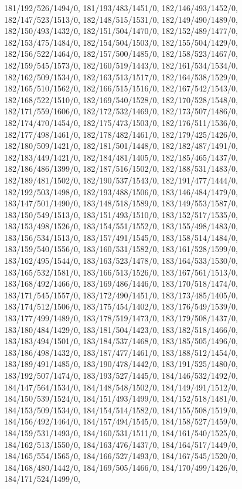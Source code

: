 {181/192/526/1494/0,%
181/193/483/1451/0,%
182/146/493/1452/0,%
182/147/523/1513/0,%
182/148/515/1531/0,%
182/149/490/1489/0,%
182/150/493/1432/0,%
182/151/504/1470/0,%
182/152/489/1477/0,%
182/153/475/1484/0,%
182/154/504/1503/0,%
182/155/504/1429/0,%
182/156/522/1464/0,%
182/157/500/1485/0,%
182/158/523/1467/0,%
182/159/545/1573/0,%
182/160/519/1443/0,%
182/161/534/1534/0,%
182/162/509/1534/0,%
182/163/513/1517/0,%
182/164/538/1529/0,%
182/165/510/1562/0,%
182/166/515/1516/0,%
182/167/542/1543/0,%
182/168/522/1510/0,%
182/169/540/1528/0,%
182/170/528/1548/0,%
182/171/559/1606/0,%
182/172/532/1469/0,%
182/173/507/1486/0,%
182/174/470/1454/0,%
182/175/473/1503/0,%
182/176/511/1536/0,%
182/177/498/1461/0,%
182/178/482/1461/0,%
182/179/425/1426/0,%
182/180/509/1421/0,%
182/181/501/1448/0,%
182/182/487/1491/0,%
182/183/449/1421/0,%
182/184/481/1405/0,%
182/185/465/1437/0,%
182/186/486/1399/0,%
182/187/516/1502/0,%
182/188/531/1483/0,%
182/189/481/1502/0,%
182/190/537/1543/0,%
182/191/477/1444/0,%
182/192/503/1498/0,%
182/193/488/1506/0,%
183/146/484/1479/0,%
183/147/501/1490/0,%
183/148/518/1589/0,%
183/149/553/1587/0,%
183/150/549/1513/0,%
183/151/493/1510/0,%
183/152/517/1535/0,%
183/153/498/1526/0,%
183/154/551/1552/0,%
183/155/498/1483/0,%
183/156/534/1513/0,%
183/157/491/1545/0,%
183/158/514/1484/0,%
183/159/540/1556/0,%
183/160/531/1582/0,%
183/161/528/1599/0,%
183/162/495/1544/0,%
183/163/523/1478/0,%
183/164/533/1530/0,%
183/165/532/1581/0,%
183/166/513/1526/0,%
183/167/561/1513/0,%
183/168/492/1466/0,%
183/169/486/1446/0,%
183/170/518/1474/0,%
183/171/545/1557/0,%
183/172/490/1451/0,%
183/173/485/1405/0,%
183/174/512/1506/0,%
183/175/454/1402/0,%
183/176/549/1539/0,%
183/177/499/1489/0,%
183/178/519/1473/0,%
183/179/508/1437/0,%
183/180/484/1429/0,%
183/181/504/1423/0,%
183/182/518/1466/0,%
183/183/494/1501/0,%
183/184/537/1468/0,%
183/185/505/1496/0,%
183/186/498/1432/0,%
183/187/477/1461/0,%
183/188/512/1454/0,%
183/189/491/1485/0,%
183/190/478/1442/0,%
183/191/525/1480/0,%
183/192/507/1474/0,%
183/193/527/1445/0,%
184/146/532/1492/0,%
184/147/564/1534/0,%
184/148/548/1502/0,%
184/149/491/1512/0,%
184/150/539/1524/0,%
184/151/493/1499/0,%
184/152/518/1481/0,%
184/153/509/1534/0,%
184/154/514/1582/0,%
184/155/508/1519/0,%
184/156/492/1464/0,%
184/157/494/1545/0,%
184/158/527/1459/0,%
184/159/531/1493/0,%
184/160/531/1511/0,%
184/161/540/1525/0,%
184/162/513/1550/0,%
184/163/476/1437/0,%
184/164/517/1449/0,%
184/165/554/1565/0,%
184/166/527/1493/0,%
184/167/545/1520/0,%
184/168/480/1442/0,%
184/169/505/1466/0,%
184/170/499/1426/0,%
184/171/524/1499/0,%
}
